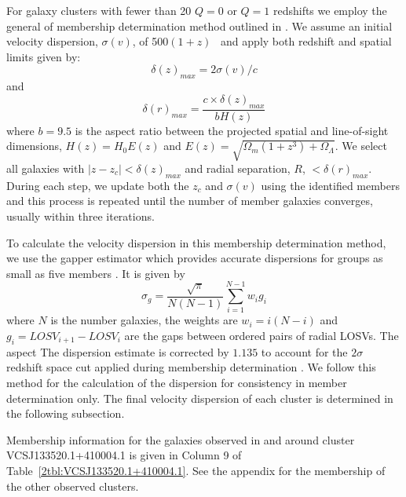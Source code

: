 For galaxy clusters with fewer than 20 $Q=0$ or $Q=1$ redshifts we employ the general of membership determination method outlined in \cite{Wilman2005, Connelly2012}. We assume an initial velocity dispersion, $\sigma(v)$, of 500$(1+z)$ \kms\ and apply both redshift and spatial limits given by: 
\begin{equation}
	\delta(z)_{max} = 2 \sigma(v)/c 
\end{equation}
and 
\begin{equation}
	\delta(r)_{max} = \frac{c\times\delta(z)_{max}}{bH(z)} 
\end{equation}
where $b=9.5$ is the aspect ratio between the projected spatial and line-of-sight dimensions, $H(z) = H_0 E(z)$ and $E(z) = \sqrt{\Omega_m(1+z^3)+\Omega_{\Lambda}}$. We select all galaxies with $|z-z_c| < \delta(z)_{max}$ and radial separation, $R$, $<\delta(r)_{max}$. During each step, we update both the $z_c$ and $\sigma(v)$ using the identified members and this process is repeated until the number of member galaxies converges, usually within three iterations.

To calculate the velocity dispersion in this membership determination method, we use the gapper estimator \citep{Beers1990} which provides accurate dispersions for groups as small as five members \citep{Hou2009}. It is given by 
\begin{equation}
	\sigma_g = \frac{\sqrt{\pi}}{N(N-1)} \sum_{i=1}^{N-1} w_i g_i
\end{equation}
where $N$ is the number galaxies, the weights are $w_i = i(N-i)$ and $g_i = LOSV_{i+1} - LOSV_i$ are the gaps between ordered pairs of radial LOSVs. The aspect  The dispersion estimate is corrected by $1.135$ to account for the $2\sigma$ redshift space cut applied during membership determination \citep{Connelly2012}. We follow this method for the calculation of the dispersion for consistency in member determination only. The final velocity dispersion of each cluster is determined in the following subsection.

Membership information for the galaxies observed in and around cluster VCSJ133520.1+410004.1 is given in Column 9 of Table~\ref{2tbl:VCSJ133520.1+410004.1}. See the appendix for the membership of the other observed clusters.

